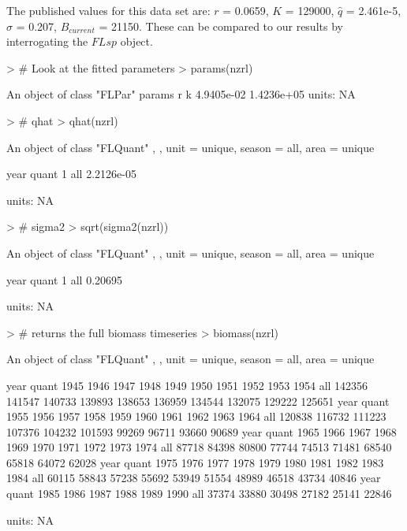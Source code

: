 \documentclass[a4paper]{article}
\begin{document}
The published values for this data set are:
$r$ = 0.0659, 
$K$ = 129000, 
$\hat{q}$ = 2.461e-5, 
$\sigma$ = 0.207, 
$B_{current}$ = 21150. 
These can be compared to our results by interrogating the $FLsp$ object.
\begin{center}
\begin{minipage}[H]{0.95\textwidth}%
\begin{shaded}%
\begin{Schunk}
\begin{Sinput}
> # Look at the fitted parameters
> params(nzrl)
\end{Sinput}
\begin{Soutput}
An object of class "FLPar"
params
         r          k 
4.9405e-02 1.4236e+05 
units:  NA 
\end{Soutput}
\begin{Sinput}
> # qhat
> qhat(nzrl)
\end{Sinput}
\begin{Soutput}
An object of class "FLQuant"
, , unit = unique, season = all, area = unique

     year
quant 1         
  all 2.2126e-05

units:  NA 
\end{Soutput}
\begin{Sinput}
> # sigma2
> sqrt(sigma2(nzrl))
\end{Sinput}
\begin{Soutput}
An object of class "FLQuant"
, , unit = unique, season = all, area = unique

     year
quant 1      
  all 0.20695

units:  NA 
\end{Soutput}
\begin{Sinput}
> # returns the full biomass timeseries
> biomass(nzrl)
\end{Sinput}
\begin{Soutput}
An object of class "FLQuant"
, , unit = unique, season = all, area = unique

     year
quant 1945   1946   1947   1948   1949   1950   1951   1952   1953   1954  
  all 142356 141547 140733 139893 138653 136959 134544 132075 129222 125651
     year
quant 1955   1956   1957   1958   1959   1960   1961   1962   1963   1964  
  all 120838 116732 111223 107376 104232 101593  99269  96711  93660  90689
     year
quant 1965   1966   1967   1968   1969   1970   1971   1972   1973   1974  
  all  87718  84398  80800  77744  74513  71481  68540  65818  64072  62028
     year
quant 1975   1976   1977   1978   1979   1980   1981   1982   1983   1984  
  all  60115  58843  57238  55692  53949  51554  48989  46518  43734  40846
     year
quant 1985   1986   1987   1988   1989   1990  
  all  37374  33880  30498  27182  25141  22846

units:  NA 
\end{Soutput}
\end{Schunk}
\end{shaded}%
\end{minipage}
\end{center}
\end{document}
